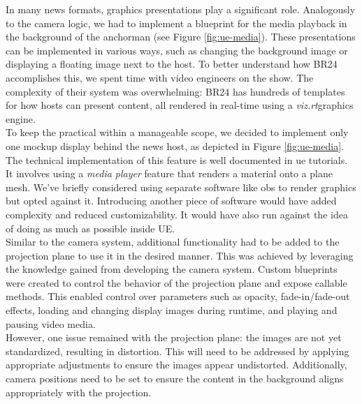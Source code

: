 \documentclass[
  a4paper,  %
  twoside,  %
  bibliography=totoc,
  headsepline,
  cleardoublepage=empty,
  parskip=half,
  draft=false
]{scrbook}
\begin{document}
In many news formats, graphics presentations play a significant role. Analogously to the camera logic, we had to implement a blueprint for the media playback in the background of the anchorman (see Figure \ref{fig:ue-media}). These presentations can be implemented in various ways, such as changing the background image or displaying a floating image next to the host. To better understand how BR24 accomplishes this, we spent time with video engineers on the show. The complexity of their system was overwhelming: BR24 has hundreds of templates for how hosts can present content, all rendered in real-time using a \textit{viz.rt}graphics engine. \\
To keep the practical within a manageable scope, we decided to implement only one mockup display behind the news host, as depicted in Figure \ref{fig:ue-media}. The technical implementation of this feature is well documented in \gls{ue} tutorials. It involves using a \textit{media player} feature that renders a material onto a plane mesh. We've briefly considered using separate software like \gls{obs} to render graphics but opted against it. Introducing another piece of software would have added complexity and reduced customizability. It would have also run against the idea of doing as much as possible inside UE. \\
Similar to the camera system, additional functionality had to be added to the projection plane to use it in the desired manner. This was achieved by leveraging the knowledge gained from developing the camera system. Custom blueprints were created to control the behavior of the projection plane and expose callable methods. This enabled control over parameters such as opacity, fade-in/fade-out effects, loading and changing display images during runtime, and playing and pausing video media. \\
However, one issue remained with the projection plane: the images are not yet standardized, resulting in distortion. This will need to be addressed by applying appropriate adjustments to ensure the images appear undistorted. Additionally, camera positions need to be set to ensure the content in the background aligns appropriately with the projection.
\end{document}
